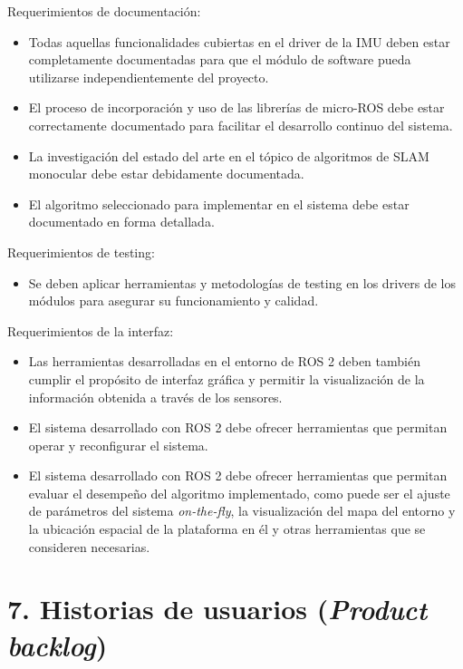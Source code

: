 \documentclass[
11pt, %
codirector, %
]{charter}
\begin{document}
Requerimientos de documentación:
\begin{itemize}
	\item Todas aquellas funcionalidades cubiertas en el driver de la IMU deben estar completamente documentadas para que el módulo de software pueda utilizarse independientemente del proyecto.
	\item El proceso de incorporación y uso de las librerías de micro-ROS debe estar correctamente documentado para facilitar el desarrollo continuo del sistema.
	\item La investigación del estado del arte en el tópico de algoritmos de SLAM monocular debe estar debidamente documentada.
	\item El algoritmo seleccionado para implementar en el sistema debe estar documentado en forma detallada.
\end{itemize}

Requerimientos de testing:
\begin{itemize}
	\item Se deben aplicar herramientas y metodologías de testing en los drivers de los módulos para asegurar su funcionamiento y calidad.
\end{itemize}

Requerimientos de la interfaz:
\begin{itemize}
	\item Las herramientas desarrolladas en el entorno de ROS 2 deben también cumplir el propósito de interfaz gráfica y permitir la visualización de la información obtenida a través de los sensores.
	\item El sistema desarrollado con ROS 2 debe ofrecer herramientas que permitan operar y reconfigurar el sistema.
	\item El sistema desarrollado con ROS 2 debe ofrecer herramientas que permitan evaluar el desempeño del algoritmo implementado, como puede ser el ajuste de parámetros del sistema \textit{on-the-fly}, la visualización del mapa del entorno y la ubicación espacial de la plataforma en él y otras herramientas que se consideren necesarias.
\end{itemize}

\section{7. Historias de usuarios (\textit{Product backlog})}
\label{sec:backlog}
\end{document}
